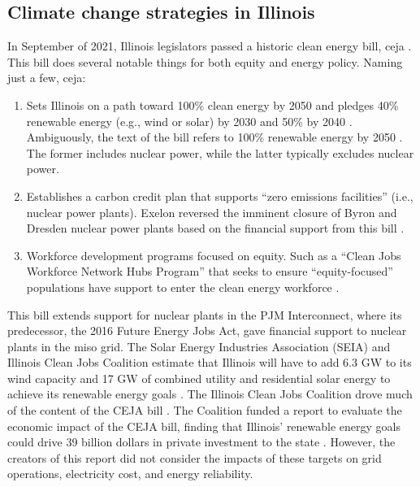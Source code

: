 \subsection{Climate change strategies in Illinois}
\label{section:ceja}
In September of 2021, Illinois legislators passed a historic clean energy bill,
\gls{ceja} \cite{harmon_climate_2021}. This bill does several notable things for
both equity and energy policy. Naming just a few, \gls{ceja}:
\begin{enumerate}
  \item Sets Illinois on a path toward 100\% clean energy by 2050 and pledges 40\% renewable
  energy (e.g., wind or solar) by 2030 and 50\% by 2040
  \cite{office_of_governor_jb_pritzker_gov_2021}. Ambiguously,
  the text of the bill refers to 100\% renewable energy by 2050 \cite{harmon_climate_2021}.
  The former includes nuclear power, while the latter typically excludes nuclear power.
  \item Establishes a carbon credit plan that supports “zero emissions facilities”
  (i.e., nuclear power plants). Exelon reversed the imminent closure of Byron and
  Dresden nuclear power plants based on the financial support from this bill
  \cite{brown_two_2021}.
  \item Workforce development programs focused on equity. Such as a
  “Clean Jobs Workforce Network Hubs Program” that seeks to ensure “equity-focused”
  populations have support to enter the clean energy workforce
  \cite{office_of_governor_jb_pritzker_gov_2021}.
\end{enumerate}
This bill extends support for nuclear plants in the PJM Interconnect, where its
predecessor, the 2016 Future Energy Jobs Act, gave financial support to nuclear
plants in the \gls{miso} grid. The Solar Energy Industries Association (SEIA) and Illinois
Clean Jobs Coalition estimate that Illinois will have to add 6.3 GW to its wind capacity
and 17 GW of combined utility and residential solar energy
to achieve its renewable energy goals \cite{goeller_new_2021, the_accelerate_group_clean_2019}.
The Illinois Clean Jobs Coalition drove much of the content of the CEJA bill
\cite{the_accelerate_group_clean_2019}.
The Coalition funded a report to evaluate the economic impact of the CEJA bill,
finding that Illinois’ renewable energy goals could drive 39 billion dollars in
private investment to the state \cite{the_accelerate_group_clean_2019}.
However, the creators of this report did not consider the impacts of these targets
on grid operations, electricity cost, and energy reliability.

